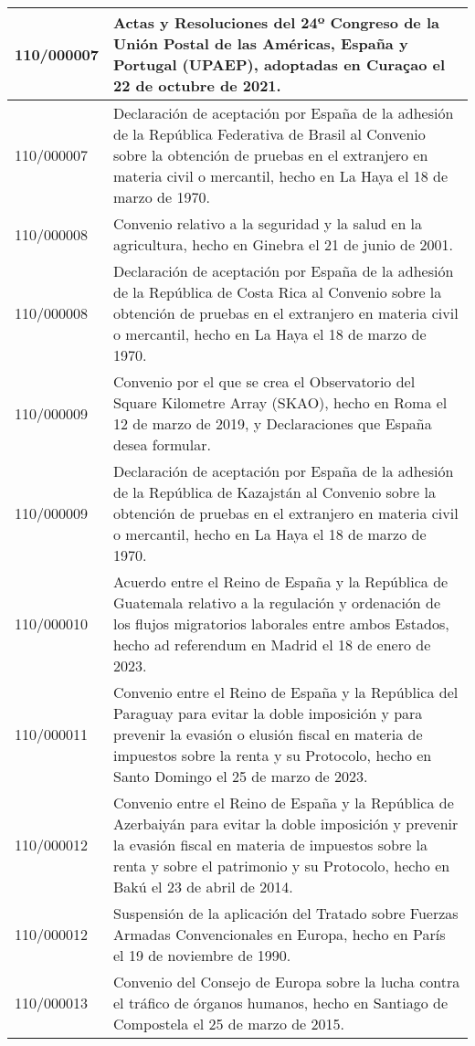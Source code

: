{\begin{table}[H]
\begin{center}
\begin{tabularx}{\linewidth}{| l | X |}
\hline
110/000007 & Actas y Resoluciones del 24º Congreso de la Unión Postal de las Américas, España y Portugal (UPAEP), adoptadas en Curaçao el 22 de octubre de 2021. \\
\hline
110/000007 & Declaración de aceptación por España de la adhesión de la República Federativa de Brasil al Convenio sobre la obtención de pruebas en el extranjero en materia civil o mercantil, hecho en La Haya el 18 de marzo de 1970. \\
\hline
110/000008 & Convenio relativo a la seguridad y la salud en la agricultura, hecho en Ginebra el 21 de junio de 2001. \\
\hline
110/000008 & Declaración de aceptación por España de la adhesión de la República de Costa Rica al Convenio sobre la obtención de pruebas en el extranjero en materia civil o mercantil, hecho en La Haya el 18 de marzo de 1970. \\
\hline
110/000009 & Convenio por el que se crea el Observatorio del Square Kilometre Array (SKAO), hecho en Roma el 12 de marzo de 2019, y Declaraciones que España desea formular. \\
\hline
110/000009 & Declaración de aceptación por España de la adhesión de la República de Kazajstán al Convenio sobre la obtención de pruebas en el extranjero en materia civil o mercantil, hecho en La Haya el 18 de marzo de 1970. \\
\hline
110/000010 & Acuerdo entre el Reino de España y la República de Guatemala relativo a la regulación y ordenación de los flujos migratorios laborales entre ambos Estados, hecho ad referendum en Madrid el 18 de enero de 2023. \\
\hline
110/000011 & Convenio entre el Reino de España y la República del Paraguay para evitar la doble imposición y para prevenir la evasión o elusión fiscal en materia de impuestos sobre la renta y su Protocolo, hecho en Santo Domingo el 25 de marzo de 2023. \\
\hline
110/000012 & Convenio entre el Reino de España y la República de Azerbaiyán para evitar la doble imposición y prevenir la evasión fiscal en materia de impuestos sobre la renta y sobre el patrimonio y su Protocolo, hecho en Bakú el 23 de abril de 2014. \\
\hline
110/000012 & Suspensión de la aplicación del Tratado sobre Fuerzas Armadas Convencionales en Europa, hecho en París el 19 de noviembre de 1990. \\
\hline
110/000013 & Convenio del Consejo de Europa sobre la lucha contra el tráfico de órganos humanos, hecho en Santiago de Compostela el 25 de marzo de 2015. \\

\end{tabularx}
\end{center}
\end{table}}
